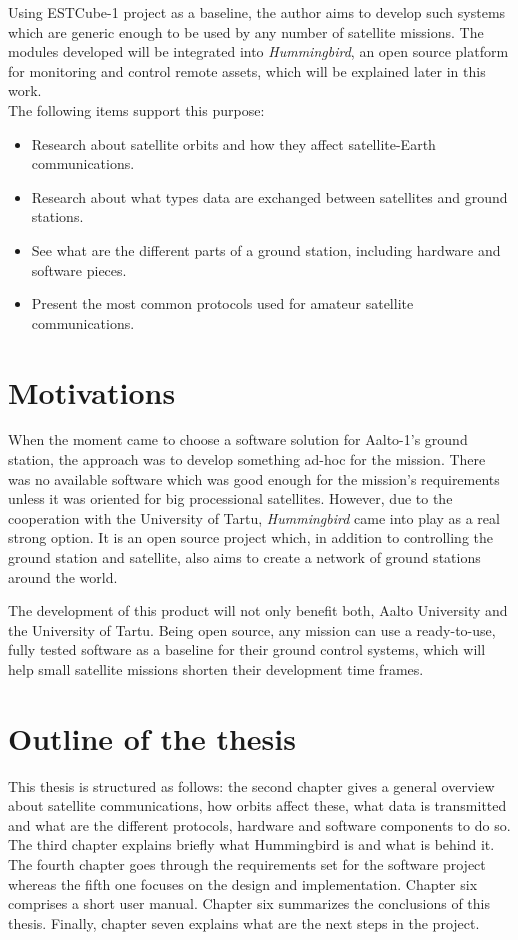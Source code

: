 Using ESTCube-1 project as a baseline, the author aims to develop such systems which are generic enough to be used by any number of satellite missions. The modules developed will be integrated into \emph{Hummingbird}, an open source platform for monitoring and control remote assets, which will be explained later in this work.\\ 
The following items support this purpose:
\begin{itemize}
	\item Research about satellite orbits and how they affect satellite-Earth communications.
	\item Research about what types data are exchanged between satellites and ground stations.
	\item See what are the different parts of a ground station, including hardware and software pieces.
	\item Present the most common protocols used for amateur satellite communications. 
\end{itemize}

\section{Motivations}

When the moment came to choose a software solution for Aalto-1's ground station, the approach was to develop something ad-hoc for the mission. There was no available software which was good enough for the mission's requirements unless it was oriented for big processional satellites. However, due to the cooperation with the University of Tartu, \emph{Hummingbird} came into play as a real strong option. It is an open source project which, in addition to controlling the ground station and satellite, also aims to create a network of ground stations around the world. 

The development of this product will not only benefit both, Aalto University and the University of Tartu. Being open source, any mission can use a ready-to-use, fully tested software as a baseline for their ground control systems, which will help small satellite missions shorten their development time frames. 

\pagebreak
\section{Outline of the thesis}
This thesis is structured as follows: the second chapter gives a general overview about satellite communications, how orbits affect these, what data is transmitted and what are the different protocols, hardware and software components to do so. The third chapter explains briefly what Hummingbird is and what is behind it. The fourth chapter goes through the requirements set for the software project whereas the fifth one focuses on the design and implementation. Chapter six comprises a short user manual. Chapter six summarizes the conclusions of this thesis. Finally, chapter seven explains what are the next steps in the project.

\newpage
